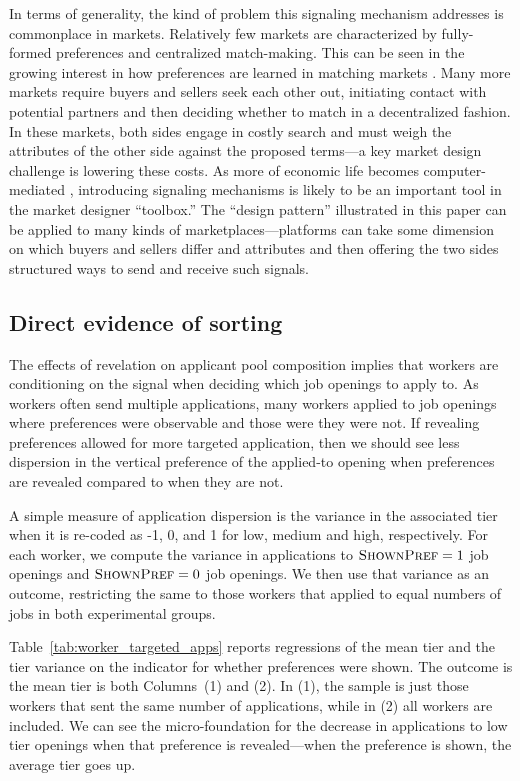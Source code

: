 In terms of generality, the kind of problem this signaling mechanism addresses is commonplace in markets.
Relatively few markets are characterized by fully-formed preferences and centralized match-making.
This can be seen in the growing interest in how preferences are learned in matching markets \citep{acemoglu2017, ashlagi2017communication}.
Many more markets require buyers and sellers seek each other out, initiating contact with potential partners and then deciding whether to match in a decentralized fashion.
In these markets, both sides engage in costly search and must weigh the attributes of the other side against the proposed terms---a key market design challenge is lowering these costs.
As more of economic life becomes computer-mediated \citep{varian2010computer}, introducing signaling mechanisms is likely to be an important tool in the market designer ``toolbox.''
The ``design pattern'' illustrated in this paper can be applied to many kinds of marketplaces---platforms can take some dimension on which buyers and sellers differ and attributes and then offering the two sides structured ways to send and receive such signals. 


\subsection{Direct evidence of sorting} 
The effects of revelation on applicant pool composition implies that workers are conditioning on the signal when deciding which job openings to apply to.
As workers often send multiple applications, many workers applied to job openings where preferences were observable and those were they were not.
If revealing preferences allowed for more targeted application, then we should see less dispersion in the vertical preference of the applied-to opening when preferences are revealed compared to when they are not.

A simple measure of application dispersion is the variance in the associated tier when it is re-coded as -1, 0, and 1 for low, medium and high, respectively.
For each worker, we compute the variance in applications to $\textsc{ShownPref} = 1$ job openings and $\textsc{ShownPref} = 0$ job openings.
We then use that variance as an outcome, restricting the same to those workers that applied to equal numbers of jobs in both experimental groups. 



Table~\ref{tab:worker_targeted_apps} reports regressions of the mean tier and the tier variance on the indicator for whether preferences were shown.
The outcome is the mean tier is both Columns~(1) and (2). 
In (1), the sample is just those workers that sent the same number of applications, while in (2) all workers are included. 
We can see the micro-foundation for the decrease in applications to low tier openings when that preference is revealed---when the preference is shown, the average tier goes up.

